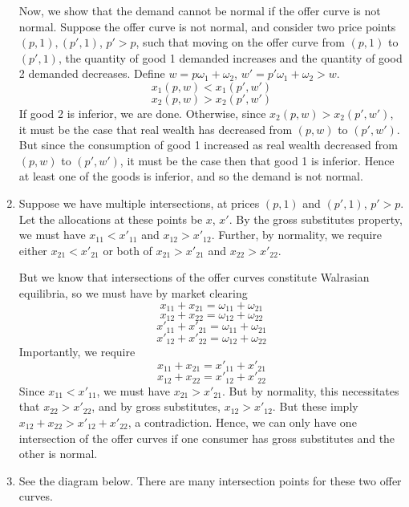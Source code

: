 \documentclass[10pt,letter]{article}
\begin{document}
\begin{enumerate}[label=(\alph*)]
Now, we show that the demand cannot be normal if the offer curve is not normal. Suppose the offer curve is not normal, and consider two price points $(p,1), (p', 1)$, $p' > p$, such that moving on the offer curve from $(p,1)$ to $(p',1)$, the quantity of good 1 demanded increases and the quantity of good 2 demanded decreases. Define $w = p\omega_1 + \omega_2$, $w' = p'\omega_1 + \omega_2 > w$.
\[ x_1(p, w) < x_1(p', w') \]
\[ x_2(p, w) > x_2(p', w') \]
If good 2 is inferior, we are done. Otherwise, since $x_2(p,w) > x_2(p',w')$, it must be the case that real wealth has decreased from $(p,w)$ to $(p',w')$. But since the consumption of good 1 increased as real wealth decreased from $(p,w)$ to $(p',w')$, it must be the case then that good 1 is inferior. Hence at least one of the goods is inferior, and so the demand is not normal.
\item Suppose we have multiple intersections, at prices $(p,1)$ and $(p',1)$, $p' > p$. Let the allocations at these points be $x$, $x'$. By the gross substitutes property, we must have $x_{11} < x'_{11}$ and $x_{12} > x'_{12}$. Further, by normality, we require either $x_{21} < x'_{21}$ or both of $x_{21} > x'_{21}$ and $x_{22} > x'_{22}$.

But we know that intersections of the offer curves constitute Walrasian equilibria, so we must have by market clearing
\[ x_{11} + x_{21} = \omega_{11} + \omega_{21}  \]
\[ x_{12} + x_{22} = \omega_{12} + \omega_{22}  \]
\[ x'_{11} + x'_{21} = \omega_{11} + \omega_{21}  \]
\[ x'_{12} + x'_{22} = \omega_{12} + \omega_{22}  \]
Importantly, we require
\[ x_{11} + x_{21} = x'_{11} + x'_{21} \]
\[ x_{12} + x_{22} = x'_{12} + x'_{22} \]
Since $x_{11} < x'_{11}$, we must have $x_{21} > x'_{21}$. But by normality, this necessitates that $x_{22} > x'_{22}$, and by gross substitutes, $x_{12} > x'_{12}$. But these imply $x_{12} + x_{22} > x'_{12} + x'_{22}$, a contradiction. Hence, we can only have one intersection of the offer curves if one consumer has gross substitutes and the other is normal.

\item See the diagram below. There are many intersection points for these two offer curves.

\end{enumerate}
\end{document}
